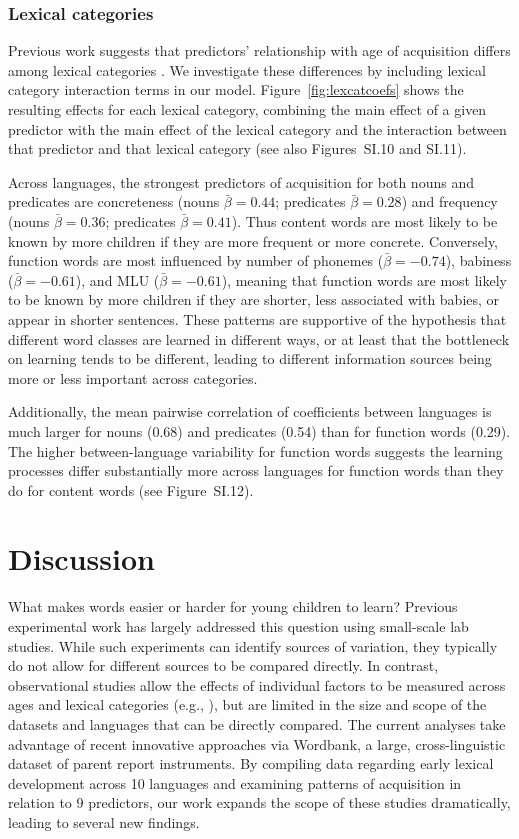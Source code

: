 \documentclass[manuscript]{stjour}
\begin{document}
\subsubsection{Lexical categories}

Previous work suggests that predictors' relationship with age of
acquisition differs among lexical categories \citep{goodman2008}. We
investigate these differences by including lexical category interaction
terms in our model. Figure~\ref{fig:lexcatcoefs} shows the resulting
effects for each lexical category, combining the main effect of a given
predictor with the main effect of the lexical category and the
interaction between that predictor and that lexical category (see also
Figures~SI.10 and SI.11).

Across languages, the strongest predictors of acquisition for both nouns
and predicates are concreteness (nouns \(\bar{\beta} = 0.44\);
predicates \(\bar{\beta} = 0.28\)) and frequency (nouns
\(\bar{\beta} = 0.36\); predicates \(\bar{\beta} = 0.41\)). Thus content
words are most likely to be known by more children if they are more
frequent or more concrete. Conversely, function words are most
influenced by number of phonemes (\(\bar{\beta} = -0.74\)), babiness
(\(\bar{\beta} = -0.61\)), and MLU (\(\bar{\beta} = -0.61\)), meaning
that function words are most likely to be known by more children if they
are shorter, less associated with babies, or appear in shorter
sentences. These patterns are supportive of the hypothesis that
different word classes are learned in different ways, or at least that
the bottleneck on learning tends to be different, leading to different
information sources being more or less important across categories.

Additionally, the mean pairwise correlation of coefficients between
languages is much larger for nouns (0.68) and predicates (0.54) than for
function words (0.29). The higher between-language variability for
function words suggests the learning processes differ substantially more
across languages for function words than they do for content words (see
Figure~SI.12).

\section{Discussion}

What makes words easier or harder for young children to learn? Previous
experimental work has largely addressed this question using small-scale
lab studies. While such experiments can identify sources of variation,
they typically do not allow for different sources to be compared
directly. In contrast, observational studies allow the effects of
individual factors to be measured across ages and lexical categories
(e.g., \citealp{goodman2008,hills2009,swingley2017}), but are limited in
the size and scope of the datasets and languages that can be directly
compared. The current analyses take advantage of recent innovative
approaches via Wordbank, a large, cross-linguistic dataset of parent
report instruments. By compiling data regarding early lexical
development across 10 languages and examining patterns of acquisition in
relation to 9 predictors, our work expands the scope of these studies
dramatically, leading to several new findings.
\end{document}
